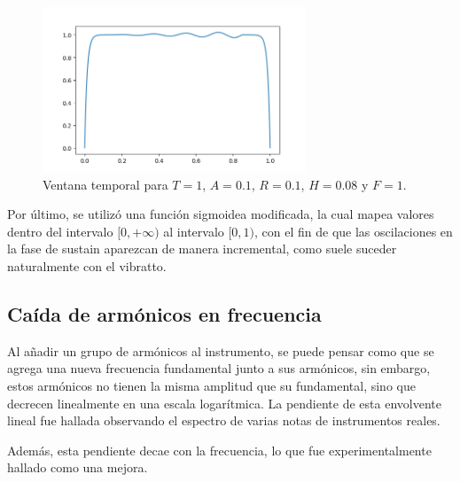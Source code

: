 \begin{figure}[H]
	\centering
	\includegraphics[width=0.7\textwidth]{ImagenesEjercicio2/adsr.png}
	\caption{Ventana temporal para $T = 1$, $A = 0.1$, $R = 0.1$, $H = 0.08$ y $F = 1$.}
	\label{vib}
\end{figure}

Por último, se utilizó una función sigmoidea modificada, la cual mapea valores dentro del intervalo $[0, +\infty)$ al intervalo $[0, 1)$, con el fin de que las oscilaciones en la fase de sustain aparezcan de manera incremental, como suele suceder naturalmente con el vibratto.

\subsection{Caída de armónicos en frecuencia}

Al añadir un grupo de armónicos al instrumento, se puede pensar como que se agrega una nueva frecuencia fundamental junto a sus armónicos, sin embargo, estos armónicos no tienen la misma amplitud que su fundamental, sino que decrecen linealmente en una escala logarítmica. La pendiente de esta envolvente lineal fue hallada observando el espectro de varias notas de instrumentos reales.

Además, esta pendiente decae con la frecuencia, lo que fue experimentalmente hallado como una mejora.